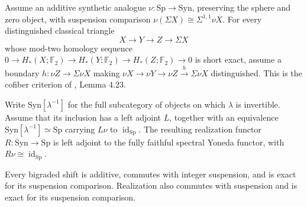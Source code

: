 \begin{definition}
\label{sem:AdamsSynthetic:synthetic-context-input}
\label{sem:AdamsSynthetic:nu}
\label{sem:AdamsSynthetic:recovery}
\label{sem:AdamsSynthetic:exact-shifts-realization}
\label{sem:AdamsSynthetic:nu-exactness}
Assume an additive synthetic analogue
$\nu:\mathrm{Sp}\to\mathrm{Syn}$, preserving the sphere and zero object,
with suspension comparison
$\nu(\Sigma X)\cong\Sigma^{1,1}\nu X$.
For every distinguished classical triangle
\[
 X\longrightarrow Y\longrightarrow Z\longrightarrow\Sigma X
\]
whose mod-two homology sequence
$0\to H_*(X;\mathbb F_2)\to H_*(Y;\mathbb F_2)
\to H_*(Z;\mathbb F_2)\to0$ is short exact, assume a boundary
$h:\nu Z\to\Sigma\nu X$ making
$\nu X\to\nu Y\to\nu Z\xrightarrow h\Sigma\nu X$ distinguished.
This is the cofiber criterion of \cite{Pst}, Lemma 4.23.

Write $\mathrm{Syn}[\lambda^{-1}]$ for the full subcategory of
objects on which $\lambda$ is invertible. Assume that its inclusion has
a left adjoint $L$, together with an equivalence
$\mathrm{Syn}[\lambda^{-1}]\simeq\mathrm{Sp}$ carrying $L\nu$ to
$\operatorname{id}_{\mathrm{Sp}}$. The resulting
realization functor $R:\mathrm{Syn}\to\mathrm{Sp}$ is left adjoint to
the fully faithful spectral Yoneda functor, with
$R\nu\cong\operatorname{id}_{\mathrm{Sp}}$.

Every bigraded shift is additive, commutes with integer suspension, and
is exact for its suspension comparison. Realization also commutes with
suspension and is exact for its suspension comparison.
\end{definition}



